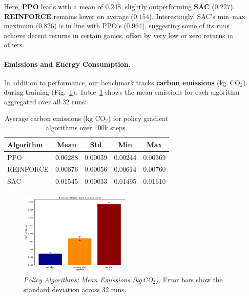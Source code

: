 \noindent
Here, \textbf{PPO} leads with a mean of $0.248$, slightly outperforming \textbf{SAC} ($0.227$). \textbf{REINFORCE} remains lower on average ($0.154$). Interestingly, SAC’s min–max maximum ($0.826$) is in line with PPO’s ($0.964$), suggesting some of its runs achieve decent returns in certain games, offset by very low or zero returns in others.

\paragraph{Emissions and Energy Consumption.}
In addition to performance, our benchmark tracks \textbf{carbon emissions} (kg~CO$_2$) during training (Fig.~\ref{fig:policy_emissions_bar}). Table~\ref{tab:policy_emissions} shows the mean emissions for each algorithm aggregated over all 32 runs:

\begin{table} 
	\centering
	\caption{Average carbon emissions (kg CO$_2$) for policy gradient algorithms over 100k steps.}
	\label{tab:policy_emissions}
	\begin{tabular}{lcccc}
		\toprule
		\textbf{Algorithm} & \textbf{Mean} & \textbf{Std} & \textbf{Min} & \textbf{Max} \\
		\midrule
		PPO         & 0.00288 & 0.00039 & 0.00244 & 0.00369 \\
		REINFORCE   & 0.00676 & 0.00056 & 0.00614 & 0.00760 \\
		SAC         & 0.01545 & 0.00033 & 0.01495 & 0.01610 \\
		\bottomrule
	\end{tabular}
\end{table}

\begin{figure} 
	\centering
	\includegraphics[width=0.5\textwidth]{figures/policy_comparison/barplot_emissions_policy_comparison.png}
	\caption{\emph{Policy Algorithms: Mean Emissions (kg\,CO$_2$).} Error bars show the standard deviation across 32 runs.}
	\label{fig:policy_emissions_bar}
\end{figure}

